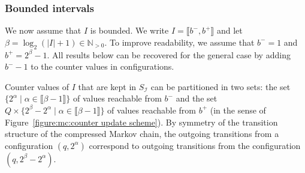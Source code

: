 \documentclass[a4paper,UKenglish,cleveref,autoref,thm-restate,colorlinks]{lipics-v2021}
\newcommand{\integerInterval}[1]{\llbracket{}#1\rrbracket{}}
\newcommand{\IN}{\mathbb{N}}
\newcommand{\INpos}{\IN_{>0}}
\newcommand{\mdpStateSpace}{S}
\newcommand{\ocStateSpace}{Q}
\newcommand{\ocState}{q}
\newcommand{\intPart}{\mathcal{I}}
\newcommand{\interval}{I}
\newcommand{\intBound}{b}
\newcommand{\intLB}{\intBound^-}
\newcommand{\intUB}{\intBound^+}
\newcommand{\powerIndex}{\alpha}
\newcommand{\powerMax}{\beta}
\newcommand{\compressChainStateSpace}{\mdpStateSpace_{\intPart}}
\begin{document}
\subsubsection{Bounded intervals}\label{section:abstraction:transitions:bounded}

We now assume that $\interval$ is bounded.
We write $\interval=\integerInterval{\intLB, \intUB}$ and let $\powerMax=\log_2(|\interval|+1)\in\INpos$.
To improve readability, we assume that $\intLB = 1$ and $\intUB = 2^\powerMax-1$.
All results below can be recovered for the general case by adding $\intLB-1$ to the counter values in configurations.

Counter values of $\interval$ that are kept in $\compressChainStateSpace$ can be partitioned in two sets: the set $\{2^{\powerIndex} \mid \powerIndex\in\integerInterval{\powerMax-1}\}$ of values reachable from $\intLB$ and the set $\ocStateSpace\times\{2^{\powerMax} - 2^{\powerIndex} \mid \powerIndex\in\integerInterval{\powerMax-1}\}$ of values reachable from $\intUB$ (in the sense of Figure~\ref{figure:mc:counter update scheme}).
By symmetry of the transition structure of the compressed Markov chain, the outgoing transitions from a configuration $(\ocState, 2^\powerIndex)$ correspond to outgoing transitions from the configuration $(\ocState, 2^\powerMax-2^\powerIndex)$.
\end{document}
